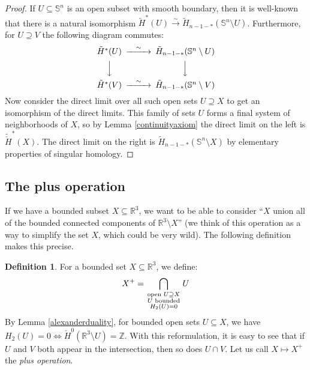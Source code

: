 \documentclass[12pt]{article}
\theoremstyle{plain}
\theoremstyle{definition}
\newtheorem{definition}[theorem]{Definition}
\theoremstyle{remark}
\numberwithin{equation}{section}
\begin{document}
\begin{proof}
If $U\subseteq\mathbb S^n$ is an open subset with smooth boundary, then it is well-known that there is a natural isomorphism $\tilde H^\ast(U)\xrightarrow\sim\tilde H_{n-1-\ast}(\mathbb S^n\setminus U)$.  Furthermore, for $U\supseteq V$ the following diagram commutes:
\begin{equation}
\begin{CD}
\tilde H^\ast(U)@>\sim >>\tilde H_{n-1-\ast}(\mathbb S^n\setminus U)\cr
@VVV@VVV\cr
\tilde H^\ast(V)@>\sim >>\tilde H_{n-1-\ast}(\mathbb S^n\setminus V)
\end{CD}
\end{equation}
Now consider the direct limit over all such open sets $U\supseteq X$ to get an isomorphism of the direct limits.  This family of sets $U$ forms a final system of neighborhoods of $X$, so by Lemma \ref{continuityaxiom} the direct limit on the left is $\tilde{\check H}^\ast(X)$.  The direct limit on the right is $\tilde H_{n-1-\ast}(\mathbb S^n\setminus X)$ by elementary properties of singular homology.
\end{proof}

\subsection{The plus operation}\label{plusopsec}

If we have a bounded subset $X\subseteq\mathbb R^3$, we want to be able to consider ``$X$ union all of the bounded connected components of $\mathbb R^3\setminus X$'' (we think of this operation as a way to simplify the set $X$, which could be very wild).  The following definition makes this precise.

\begin{definition}\label{plusdeff}
For a bounded set $X\subseteq\mathbb R^3$, we define:
\begin{equation}\label{plusdefeq}
X^+=\bigcap_{\begin{smallmatrix}\text{open }U\supseteq X\cr U\text{ bounded}\cr H_2(U)=0\end{smallmatrix}}U
\end{equation}
By Lemma \ref{alexanderduality}, for bounded open sets $U\subseteq X$, we have $H_2(U)=0\iff\check H^0(\mathbb R^3\setminus U)=\mathbb Z$.  With this reformulation, it is easy to see that if $U$ and $V$ both appear in the intersection, then so does $U\cap V$.  Let us call $X\mapsto X^+$ the \emph{plus operation}.
\end{definition}
\end{document}

